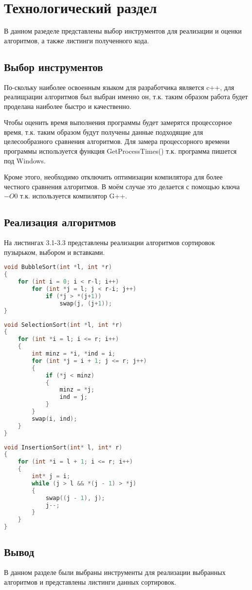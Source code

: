 \chapter{Технологический раздел}
В данном разеделе представлены выбор инструментов для реализации и оценки алгоритмов, а также листинги полученного кода.
\section{Выбор инструментов}
По-скольку наиболее освоенным языком для разработчика является c++, для реалищзации алгоритмов был выбран именно он, т.к. таким образом работа будет проделана наиболее быстро и качественно.

Чтобы оценить время выполнения программы будет замерятся процессорное время, т.к. таким образом будут получены данные подходящие для целесообразного сравнения алгоритмов. Для замера процессорного времени программы используется функция GetProcessTimes() т.к. программа пишется под Windows. \cite{get_proccess_times}

Кроме этого, необходимо отключить оптимизации компилятора для более честного сравнения алгоритмов. В моём случае это делается с помощью ключа $-O0$ т.к. используется компилятор G++. \cite{optimization}

\section{Реализация алгоритмов}
На листингах 3.1-3.3 представлены реализации алгоритмов сортировок пузырьком, выбором и вставками.

\begin{lstlisting}[language=c++, caption=Реализация алгоритма сортировки пузырьком]
void BubbleSort(int *l, int *r)
{
	for (int i = 0; i < r-l; i++)
		for (int *j = l; j < r-i; j++)
			if (*j > *(j+1))
				swap(j, (j+1));
}
\end{lstlisting}

\begin{lstlisting}[language=c++, caption=Реализация алгоритма сортировки выбором]
void SelectionSort(int *l, int *r)
{
	for (int *i = l; i <= r; i++)
	{
		int minz = *i, *ind = i;
		for (int *j = i + 1; j <= r; j++)
		{
			if (*j < minz)
			{
				minz = *j;
				ind = j;
			}
		}
		swap(i, ind);
	}
}
\end{lstlisting}

\begin{lstlisting}[language=c++, caption=Реализация алгоритма сортировки вставками]
void InsertionSort(int* l, int* r)
{
	for (int *i = l + 1; i <= r; i++)
	{
		int* j = i;
		while (j > l && *(j - 1) > *j)
		{
			swap((j - 1), j);
			j--;
		}
	}
}
\end{lstlisting}

\section{Вывод}
В данном разделе были выбраны инструменты для реализации выбранных алгоритмов и представлены листинги данных сортировок.